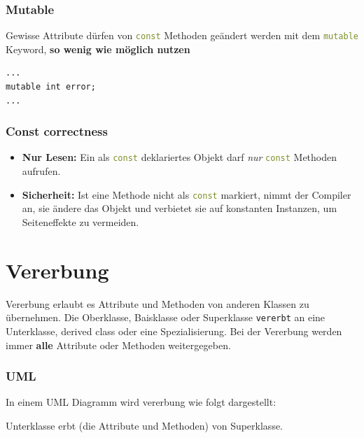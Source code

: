 


\subsubsection{Mutable}
Gewisse Attribute dürfen von \lstinline[language=C++]|const| Methoden geändert werden mit dem \lstinline[language=C++]|mutable| Keyword, \textbf{so wenig wie möglich nutzen}
\begin{lstlisting}
...
mutable int error;
...
\end{lstlisting}

\subsubsection{Const correctness}
\begin{itemize}
    \item \textbf{Nur Lesen:} Ein als \lstinline[language=C++]|const| deklariertes Objekt darf \textit{nur} \lstinline[language=C++]|const| Methoden aufrufen.
    \item \textbf{Sicherheit:} Ist eine Methode nicht als \lstinline[language=C++]|const| markiert, nimmt der Compiler an, sie ändere das Objekt und verbietet sie auf konstanten Instanzen, um Seiteneffekte zu vermeiden.
\end{itemize}

\example{}


\section{Vererbung}

Vererbung erlaubt es Attribute und Methoden von anderen Klassen zu übernehmen. 
Die Oberklasse, Baisklasse oder Superklasse \texttt{vererbt} an eine Unterklasse, derived class oder eine Spezialisierung. 
Bei der Vererbung werden immer \textbf{alle} Attribute oder Methoden weitergegeben. 
\subsubsection{UML}

In einem UML Diagramm wird vererbung wie folgt dargestellt:\\
\noindent
\begin{minipage}{0.6\columnwidth}
    
\end{minipage}\hfill
    \begin{minipage}{0.35\columnwidth}
    Unterklasse erbt (die Attribute und Methoden) von Superklasse.
\end{minipage}\vspace{1em}

